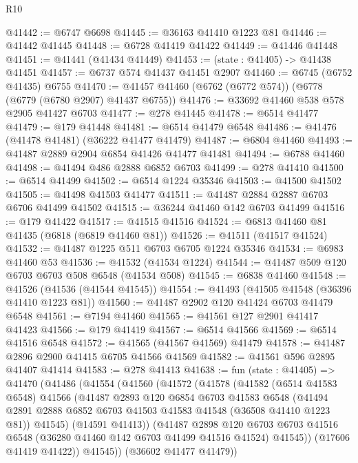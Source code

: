 \begin{lexlean}{R10}
\begin{coremodule}
@41442 := @6747 @6698
@41445 := @36163 @41410 @1223 @81
@41446 := @41442 @41445
@41448 := @6728 @41419 @41422
@41449 := @41446 @41448
@41451 := @41441 (@41434 @41449)
@41453 := (state : @41405) -> @41438 @41451
@41457 := @6737 @574 @41437 @41451 @2907
@41460 := @6745 (@6752 @41435) @6755
@41470 := @41457 @41460 (@6762 (@6772 @574)) (@6778 (@6779 (@6780 @2907) @41437 @6755))
@41476 := @33692 @41460 @538 @578 @2905 @41427 @6703
@41477 := @278 @41445
@41478 := @6514 @41477
@41479 := @179 @41448
@41481 := @6514 @41479 @6548
@41486 := @41476 (@41478 @41481) (@36222 @41477 @41479)
@41487 := @6804 @41460
@41493 := @41487 @2889 @2904 @6854 @41426 @41477 @41481
@41494 := @6788 @41460
@41498 := @41494 @486 @2888 @6852 @6703
@41499 := @278 @41410
@41500 := @6514 @41499
@41502 := @6514 @1224 @35346
@41503 := @41500 @41502
@41505 := @41498 @41503 @41477
@41511 := @41487 @2884 @2887 @6703 @6706 @41499 @41502
@41515 := @36244 @41460 @142 @6703 @41499
@41516 := @179 @41422
@41517 := @41515 @41516
@41524 := @6813 @41460 @81 @41435 (@6818 (@6819 @41460 @81))
@41526 := @41511 (@41517 @41524)
@41532 := @41487 @1225 @511 @6703 @6705 @1224 @35346
@41534 := @6983 @41460 @53
@41536 := @41532 (@41534 @1224)
@41544 := @41487 @509 @120 @6703 @6703 @508 @6548 (@41534 @508)
@41545 := @6838 @41460
@41548 := @41526 (@41536 (@41544 @41545))
@41554 := @41493 (@41505 @41548 (@36396 @41410 @1223 @81))
@41560 := @41487 @2902 @120 @41424 @6703 @41479 @6548
@41561 := @7194 @41460
@41565 := @41561 @127 @2901 @41417 @41423
@41566 := @179 @41419
@41567 := @6514 @41566
@41569 := @6514 @41516 @6548
@41572 := @41565 (@41567 @41569) @41479
@41578 := @41487 @2896 @2900 @41415 @6705 @41566 @41569
@41582 := @41561 @596 @2895 @41407 @41414
@41583 := @278 @41413
@41638 := fun (state : @41405) =>
  @41470
    (@41486
      (@41554
        (@41560
          (@41572
            (@41578
              (@41582
                (@6514 @41583 @6548)
                @41566
                (@41487
                  @2893
                  @120
                  @6854
                  @6703
                  @41583
                  @6548
                  (@41494 @2891 @2888 @6852 @6703 @41503 @41583 @41548 (@36508 @41410 @1223 @81))
                  @41545)
                (@14591 @41413))
              (@41487
                @2898
                @120
                @6703
                @6703
                @41516
                @6548
                (@36280 @41460 @142 @6703 @41499 @41516 @41524)
                @41545))
            (@17606 @41419 @41422))
          @41545))
      (@36602 @41477 @41479))

\end{coremodule}
\end{lexlean}
